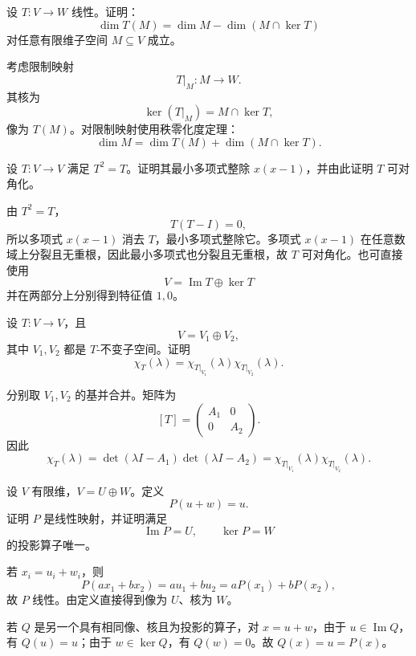 \begin{exercise}[level=advanced]
设 $T:V\to W$ 线性。证明：
\[
\dim T(M)=\dim M-\dim(M\cap\ker T)
\]
对任意有限维子空间 $M\subseteq V$ 成立。
\begin{solution}
考虑限制映射
\[
T|_M:M\to W.
\]
其核为
\[
\ker(T|_M)=M\cap\ker T,
\]
像为 $T(M)$。对限制映射使用秩零化度定理：
\[
\dim M=\dim T(M)+\dim(M\cap\ker T).
\]
\end{solution}
\end{exercise}

\begin{exercise}[level=advanced]
设 $T:V\to V$ 满足 $T^2=T$。证明其最小多项式整除 $x(x-1)$，并由此证明 $T$ 可对角化。
\begin{solution}
由 $T^2=T$，
\[
T(T-I)=0,
\]
所以多项式 $x(x-1)$ 消去 $T$，最小多项式整除它。多项式 $x(x-1)$ 在任意数域上分裂且无重根，因此最小多项式也分裂且无重根，故 $T$ 可对角化。也可直接使用
\[
V=\operatorname{Im}T\oplus\ker T
\]
并在两部分上分别得到特征值 $1,0$。
\end{solution}
\end{exercise}

\begin{exercise}[level=advanced]
设 $T:V\to V$，且
\[
V=V_1\oplus V_2,
\]
其中 $V_1,V_2$ 都是 $T$-不变子空间。证明
\[
\chi_T(\lambda)
=\chi_{T|_{V_1}}(\lambda)
\chi_{T|_{V_2}}(\lambda).
\]
\begin{solution}
分别取 $V_1,V_2$ 的基并合并。矩阵为
\[
[T]=\begin{pmatrix}A_1&0\\0&A_2\end{pmatrix}.
\]
因此
\[
\chi_T(\lambda)
=\det(\lambda I-A_1)\det(\lambda I-A_2)
=\chi_{T|_{V_1}}(\lambda)\chi_{T|_{V_2}}(\lambda).
\]
\end{solution}
\end{exercise}

\begin{exercise}[level=advanced]
设 $V$ 有限维，$V=U\oplus W$。定义
\[
P(u+w)=u.
\]
证明 $P$ 是线性映射，并证明满足
\[
\operatorname{Im}P=U,\qquad
\ker P=W
\]
的投影算子唯一。
\begin{solution}
若 $x_i=u_i+w_i$，则
\[
P(ax_1+bx_2)=a u_1+b u_2=aP(x_1)+bP(x_2),
\]
故 $P$ 线性。由定义直接得到像为 $U$、核为 $W$。

若 $Q$ 是另一个具有相同像、核且为投影的算子，对 $x=u+w$，由于 $u\in\operatorname{Im}Q$，有 $Q(u)=u$；由于 $w\in\ker Q$，有 $Q(w)=0$。故 $Q(x)=u=P(x)$。
\end{solution}
\end{exercise}


